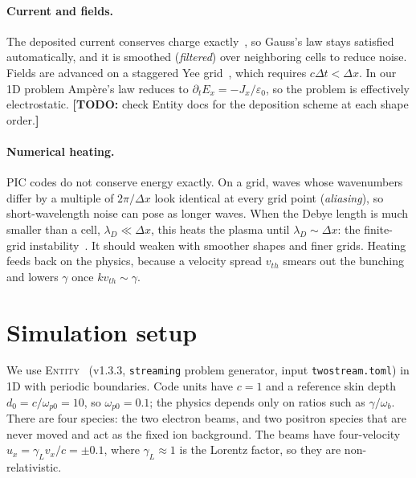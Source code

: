 \documentclass[10pt,twocolumn,letterpaper]{article}
\newcommand{\wb}{\omega_b}            %
\newif\ifdraft \drafttrue
\newcommand{\todo}[1]{\ifdraft{\color{red}\textbf{[TODO:} #1\textbf{]}}\fi}
\begin{document}
\paragraph{Current and fields.}
The deposited current conserves charge exactly~\citep{Esirkepov2001,Umeda2003}, so Gauss's law
stays satisfied automatically, and it is smoothed (\emph{filtered}) over neighboring cells to
reduce noise. Fields are advanced on a staggered Yee grid~\citep{Yee1966}, which requires
$c\Delta t<\Delta x$. In our 1D problem Amp\`ere's law reduces to
$\partial_t E_x=-J_x/\varepsilon_0$, so the problem is effectively electrostatic.
\todo{check Entity docs for the deposition scheme at each shape order.}

\paragraph{Numerical heating.}
PIC codes do not conserve energy exactly. On a grid, waves whose wavenumbers differ by a
multiple of $2\pi/\Delta x$ look identical at every grid point (\emph{aliasing}), so
short-wavelength noise can pose as longer waves. When the Debye length is much smaller than a
cell, $\lambda_D\ll\Delta x$, this heats the plasma until $\lambda_D\sim\Delta x$: the
finite-grid instability~\citep{Langdon1970,Okuda1972}. It should weaken with smoother shapes and
finer grids. Heating feeds back on the physics, because a velocity spread $v_{th}$ smears out
the bunching and lowers $\gamma$ once $k v_{th}\sim\gamma$.

\section{Simulation setup}
\label{sec:setup}

We use \textsc{Entity}~\citep{Entity} (v1.3.3, \texttt{streaming} problem generator, input
\texttt{twostream.toml}) in 1D with periodic boundaries. Code units have $c=1$ and a reference
skin depth $d_0=c/\omega_{p0}=10$, so $\omega_{p0}=0.1$; the physics depends only on ratios such
as $\gamma/\wb$. There are four species: the two electron beams, and two positron species that
are never moved and act as the fixed ion background. The beams have four-velocity
$u_x=\gamma_L v_x/c=\pm0.1$, where $\gamma_L\approx1$ is the Lorentz factor, so they are
non-relativistic.
\end{document}
